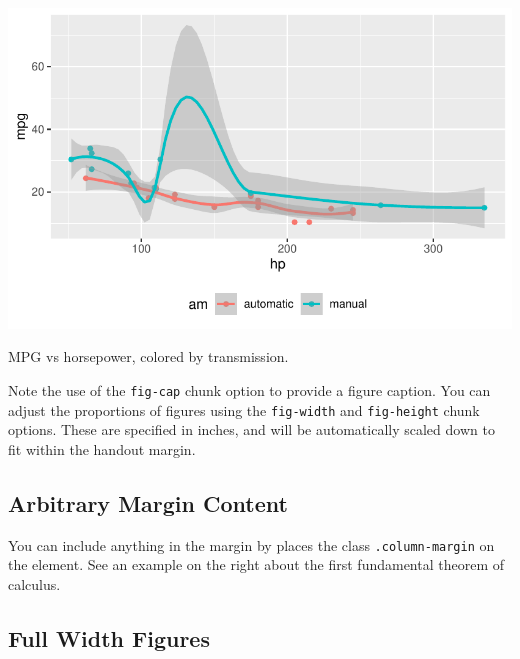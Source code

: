 \documentclass[
  letterpaper,
  DIV=11,
  numbers=noendperiod,
  oneside]{scrartcl}
\begin{document}
\begin{marginfigure}

{\centering \includegraphics{cv_files/figure-pdf/fig-margin-1.pdf}

}

\caption{\label{fig-margin}MPG vs horsepower, colored by transmission.}

\end{marginfigure}

Note the use of the \texttt{fig-cap} chunk option to provide a figure
caption. You can adjust the proportions of figures using the
\texttt{fig-width} and \texttt{fig-height} chunk options. These are
specified in inches, and will be automatically scaled down to fit within
the handout margin.

\hypertarget{arbitrary-margin-content}{%
\subsection{Arbitrary Margin Content}\label{arbitrary-margin-content}}

You can include anything in the margin by places the class
\texttt{.column-margin} on the element. See an example on the right
about the first fundamental theorem of calculus.


\hypertarget{full-width-figures}{%
\subsection{Full Width Figures}\label{full-width-figures}}
\end{document}
